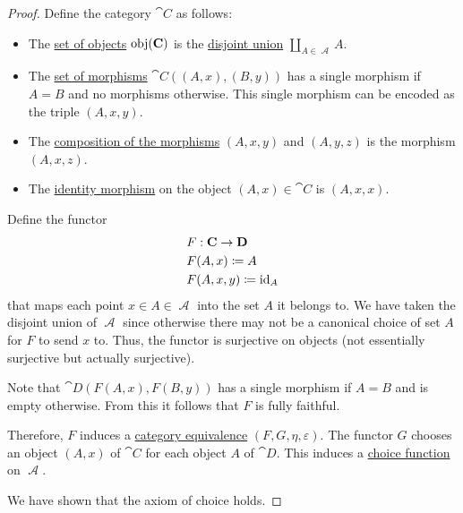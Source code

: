 \begin{proof}
  Define the category \( \cat{C} \) as follows:
  \begin{itemize}
    \item The \hyperref[def:category/objects]{set of objects} \( \operatorname{obj}(\operatorname{\mathbf{C}}) \) is the \hyperref[def:disjoint_union]{disjoint union} \( \coprod_{A \in \mscrA} A \).

    \item The \hyperref[def:category/morphisms]{set of morphisms} \( \cat{C}((A, x), (B, y)) \) has a single morphism if \( A = B \) and no morphisms otherwise. This single morphism can be encoded as the triple \( (A, x, y) \).

    \item The \hyperref[def:category/composition]{composition of the morphisms} \( (A, x, y) \) and \( (A, y, z) \) is the morphism \( (A, x, z) \).

    \item The \hyperref[def:category/identity]{identity morphism} on the object \( (A, x) \in \cat{C} \) is \( (A, x, x) \).
  \end{itemize}

  Define the functor
  \begin{equation*}
    \begin{aligned}
      &F: \operatorname{\mathbf{C}} \to \operatorname{\mathbf{D}} \\
      &F(A, x) \coloneqq A \\
      &F(A, x, y) \coloneqq \operatorname{id}_A
    \end{aligned}
  \end{equation*}
  that maps each point \( x \in A \in \mscrA \) into the set \( A \) it belongs to. We have taken the disjoint union of \( \mscrA \) since otherwise there may not be a canonical choice of set \( A \) for \( F \) to send \( x \) to. Thus, the functor is surjective on objects (not essentially surjective but actually surjective).

  Note that \( \cat{D}(F(A, x), F(B, y)) \) has a single morphism if \( A = B \) and is empty otherwise. From this it follows that \( F \) is fully faithful.

  Therefore, \( F \) induces a \hyperref[def:category_equivalence]{category equivalence} \( (F, G, \eta, \varepsilon) \). The functor \( G \) chooses an object \( (A, x) \) of \( \cat{C} \) for each object \( A \) of \( \cat{D} \). This induces a \hyperref[def:choice_function]{choice function} on \( \mscrA \).

  We have shown that the axiom of choice holds.
\end{proof}

